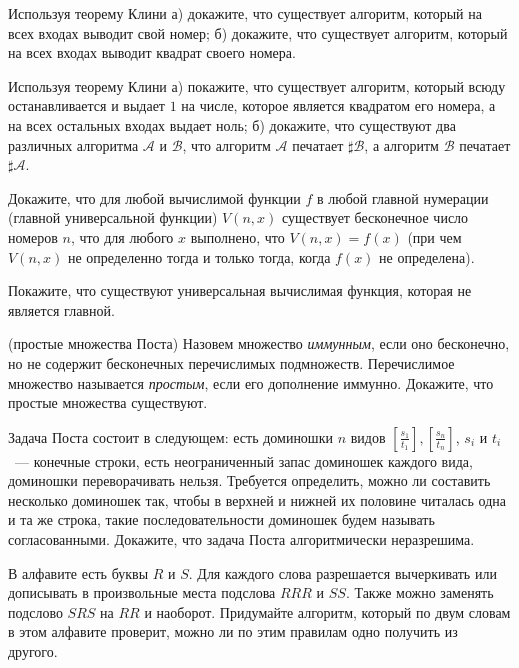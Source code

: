 
\newcommand{\dom}[2]{\left[\frac{#1}{#2}\right]}


\begin{task}
    Используя теорему Клини а) докажите, что существует алгоритм, который на всех входах выводит свой номер;
    б) докажите, что существует алгоритм, который на всех входах выводит квадрат своего номера.
\end{task}

\begin{task}
    Используя теорему Клини а) покажите, что существует алгоритм, который всюду останавливается и выдает $1$ на числе, которое
    является квадратом его номера, а на всех остальных входах выдает ноль; б) докажите, что существуют два различных алгоритма
    $\mathcal{A}$ и $\mathcal{B}$, что алгоритм $\mathcal{A}$ печатает $\sharp \mathcal{B}$, а алгоритм $\mathcal{B}$ печатает
    $\sharp \mathcal{A}$. 
\end{task}

\begin{task}
	Докажите, что для любой вычислимой функции $f$ в любой главной нумерации (главной универсальной функции) $V(n, x)$ существует
    бесконечное число номеров $n$, что для любого $x$ выполнено, что $V(n, x) = f(x)$ (при чем $V(n, x)$ не определенно тогда и
    только тогда, когда $f(x)$ не определена).
\end{task}

\begin{task}
   Покажите, что существуют универсальная вычислимая функция, которая не является главной.
\end{task}


\breakline

\begin{ptask}{18} (простые множества Поста)
    Назовем множество {\it иммунным}, если оно бесконечно, но не содержит бесконечных перечислимых подмножеств. Перечислимое
    множество называется {\it простым}, если его дополнение иммунно. Докажите, что простые множества существуют.
\end{ptask}

\begin{ptask}{21}
	Задача Поста состоит в следующем: есть доминошки $n$ видов $\dom{s_1}{t_1}, \dom{s_n}{t_n}$, $s_i$ и $t_i$~--- конечные
    строки, есть неограниченный запас доминошек каждого вида, доминошки переворачивать нельзя. Требуется определить, можно ли
    составить несколько доминошек так, чтобы в верхней и нижней их половине читалась одна и та же строка, такие последовательности
    доминошек будем называть согласованными. Докажите, что задача Поста алгоритмически неразрешима.
\end{ptask}

\begin{ptask}{22}
	В алфавите есть буквы $R$ и $S$. Для каждого слова разрешается вычеркивать или дописывать в произвольные места подслова $RRR$
    и $SS$. Также можно заменять подслово $SRS$ на $RR$ и наоборот. Придумайте алгоритм, который по двум словам в этом алфавите
    проверит, можно ли по этим правилам одно получить из другого.
\end{ptask}
